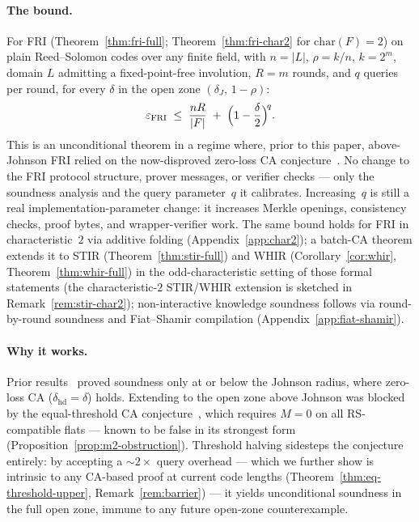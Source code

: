 \documentclass[11pt]{article}
\begin{document}
\paragraph{The bound.}
For FRI (Theorem~\ref{thm:fri-full}; Theorem~\ref{thm:fri-char2} for $\mathrm{char}(F) = 2$) on plain Reed--Solomon codes over any finite field, with $n = |L|$, $\rho = k/n$, $k = 2^m$, domain $L$ admitting a fixed-point-free involution, $R = m$ rounds, and $q$ queries per round, for every $\delta$ in the open zone $(\delta_J,\, 1{-}\rho)$:
\begin{equation}
\label{eq:fri-bound}
\varepsilon_{\mathrm{FRI}} \;\leq\; \frac{nR}{|F|} \;+\; \Bigl(1 - \frac{\delta}{2}\Bigr)^{\!q}.
\end{equation}
This is an unconditional theorem in a regime where, prior to this paper, above-Johnson FRI relied on the now-disproved zero-loss CA conjecture~\cite{ABF,CritesStewart,Kambire}.  No change to the FRI protocol structure, prover messages, or verifier checks --- only the soundness analysis and the query parameter~$q$ it calibrates.  Increasing~$q$ is still a real implementation-parameter change: it increases Merkle openings, consistency checks, proof bytes, and wrapper-verifier work.  The same bound holds for FRI in characteristic~$2$ via additive folding (Appendix~\ref{app:char2}); a batch-CA theorem extends it to STIR (Theorem~\ref{thm:stir-full}) and WHIR (Corollary~\ref{cor:whir}, Theorem~\ref{thm:whir-full}) in the odd-characteristic setting of those formal statements (the characteristic-$2$ STIR/WHIR extension is sketched in Remark~\ref{rem:stir-char2}); non-interactive knowledge soundness follows via round-by-round soundness and Fiat--Shamir compilation (Appendix~\ref{app:fiat-shamir}).

\paragraph{Why it works.}
Prior results~\cite{BCIKS,BCHKS} proved soundness only at or below the Johnson radius, where zero-loss CA ($\delta_{\mathrm{hd}} = \delta$) holds. Extending to the open zone above Johnson was blocked by the equal-threshold CA conjecture~\cite{ABF}, which requires $M = 0$ on all RS-compatible flats --- known to be false in its strongest form (Proposition~\ref{prop:m2-obstruction}). Threshold halving sidesteps the conjecture entirely: by accepting a ${\sim}2{\times}$ query overhead --- which we further show is intrinsic to any CA-based proof at current code lengths (Theorem~\ref{thm:eq-threshold-upper}, Remark~\ref{rem:barrier}) --- it yields unconditional soundness in the full open zone, immune to any future open-zone counterexample.
\end{document}
